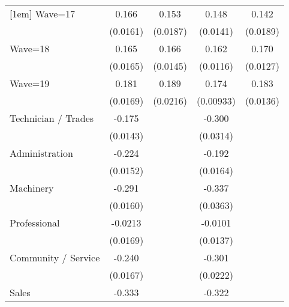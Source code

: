 {\begin{tabular}{l*{4}{c}}
[1em]
Wave=17             &       0.166\sym{***}&       0.153\sym{***}&       0.148\sym{***}&       0.142\sym{***}\\
                    &    (0.0161)         &    (0.0187)         &    (0.0141)         &    (0.0189)         \\
[1em]
Wave=18             &       0.165\sym{***}&       0.166\sym{***}&       0.162\sym{***}&       0.170\sym{***}\\
                    &    (0.0165)         &    (0.0145)         &    (0.0116)         &    (0.0127)         \\
[1em]
Wave=19             &       0.181\sym{***}&       0.189\sym{***}&       0.174\sym{***}&       0.183\sym{***}\\
                    &    (0.0169)         &    (0.0216)         &   (0.00933)         &    (0.0136)         \\
[1em]
Technician / Trades &      -0.175\sym{***}&                     &      -0.300\sym{***}&                     \\
                    &    (0.0143)         &                     &    (0.0314)         &                     \\
[1em]
Administration      &      -0.224\sym{***}&                     &      -0.192\sym{***}&                     \\
                    &    (0.0152)         &                     &    (0.0164)         &                     \\
[1em]
Machinery           &      -0.291\sym{***}&                     &      -0.337\sym{***}&                     \\
                    &    (0.0160)         &                     &    (0.0363)         &                     \\
[1em]
Professional        &     -0.0213         &                     &     -0.0101         &                     \\
                    &    (0.0169)         &                     &    (0.0137)         &                     \\
[1em]
Community / Service &      -0.240\sym{***}&                     &      -0.301\sym{***}&                     \\
                    &    (0.0167)         &                     &    (0.0222)         &                     \\
[1em]
Sales               &      -0.333\sym{***}&                     &      -0.322\sym{***}&                     \\

\end{tabular}}
